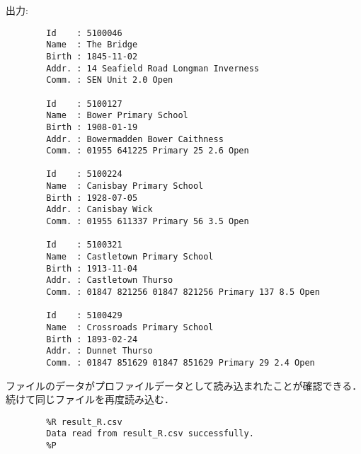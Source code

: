         出力:
        \begin{verbatim}
        Id    : 5100046
        Name  : The Bridge
        Birth : 1845-11-02
        Addr. : 14 Seafield Road Longman Inverness
        Comm. : SEN Unit 2.0 Open

        Id    : 5100127
        Name  : Bower Primary School
        Birth : 1908-01-19
        Addr. : Bowermadden Bower Caithness
        Comm. : 01955 641225 Primary 25 2.6 Open

        Id    : 5100224
        Name  : Canisbay Primary School
        Birth : 1928-07-05
        Addr. : Canisbay Wick
        Comm. : 01955 611337 Primary 56 3.5 Open

        Id    : 5100321
        Name  : Castletown Primary School
        Birth : 1913-11-04
        Addr. : Castletown Thurso
        Comm. : 01847 821256 01847 821256 Primary 137 8.5 Open

        Id    : 5100429
        Name  : Crossroads Primary School
        Birth : 1893-02-24
        Addr. : Dunnet Thurso
        Comm. : 01847 851629 01847 851629 Primary 29 2.4 Open
        \end{verbatim}
        ファイルのデータがプロファイルデータとして読み込まれたことが確認できる．
        続けて同じファイルを再度読み込む．
        \begin{verbatim}
        %R result_R.csv
        Data read from result_R.csv successfully.
        %P
        \end{verbatim}

